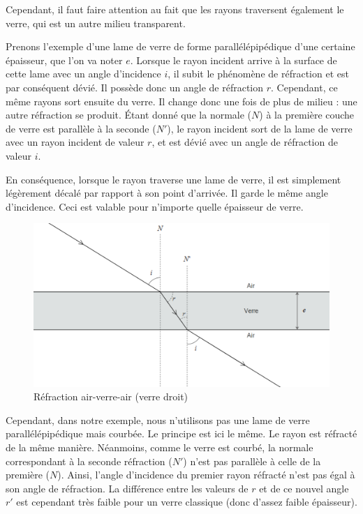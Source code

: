 \documentclass[a4paper, 12pt, onecolumn, openany]{report}
\begin{document}
	Cependant, il faut faire attention au fait que les rayons traversent également le verre, qui est un autre milieu transparent. 
	
	Prenons l'exemple d'une lame de verre de forme parallélépipédique d'une certaine épaisseur, que l'on va noter $e$. Lorsque le rayon incident arrive à la surface de cette lame avec un angle d'incidence $i$, il subit le phénomène de réfraction et est par conséquent dévié. Il possède donc un angle de réfraction $r$. Cependant, ce même rayons sort ensuite du verre. Il change donc une fois de plus de milieu : une autre réfraction se produit. Étant donné que la normale ($N$) à la première couche de verre est parallèle à la seconde ($N'$), le rayon incident sort de la lame de verre avec un rayon incident de valeur $r$, et est dévié avec un angle de réfraction de valeur $i$. 
	
	En conséquence, lorsque le rayon traverse une lame de verre, il est simplement légèrement décalé par rapport à son point d'arrivée. Il garde le même angle d'incidence. Ceci est valable pour n'importe quelle épaisseur de verre. 
	
	\begin{figure}[h]
	\begin{center}
	\includegraphics[scale=0.5]{refraction-theorie1.png}
	\end{center}
	\caption{Réfraction air-verre-air (verre droit)}
	\label{Réfraction air-verre-air (verre droit)}
	\end{figure}
	
	\newpage
	
	Cependant, dans notre exemple, nous n'utilisons pas une lame de verre parallélépipédique mais courbée. Le principe est ici le même. Le rayon est réfracté de la même manière. Néanmoins, comme le verre est courbé, la normale correspondant à la seconde réfraction ($N'$) n'est pas parallèle à celle de la première ($N$). Ainsi, l'angle d'incidence du premier rayon réfracté n'est pas égal à son angle de réfraction. La différence entre les valeurs de $r$ et de ce nouvel angle $r'$ est cependant très faible pour un verre classique (donc d'assez faible épaisseur). 
	
\end{document}
